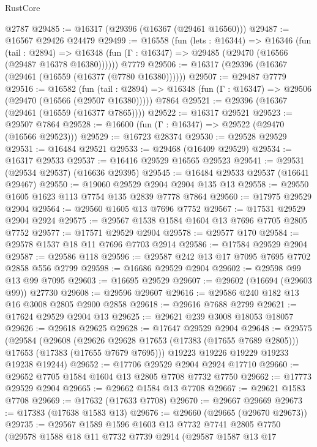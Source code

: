 \begin{lexlean}{RustCore}
\begin{coremodule}
    @2787
@29485 := @16317 (@29396 (@16367 (@29461 @16560)))
@29487 := @16567 @29426 @24479
@29499 := @16558
    (fun (lets : @16344) =>
    @16346
      (fun (tail : @2894) =>
      @16348 (fun (Γ : @16347) => @29485 (@29470 (@16566 (@29487 @16378 @16380))))))
    @7779
@29506 := @16317 (@29396 (@16367 (@29461 (@16559 (@16377 (@7780 @16380))))))
@29507 := @29487 @7779
@29516 := @16582
    (fun (tail : @2894) => @16348 (fun (Γ : @16347) => @29506 (@29470 (@16566 (@29507 @16380)))))
    @7864
@29521 := @29396 (@16367 (@29461 (@16559 (@16377 @7865))))
@29522 := @16317 @29521
@29523 := @29507 @7864
@29528 := @16600 (fun (Γ : @16347) => @29522 (@29470 (@16566 @29523)))
@29529 := @16723 @28374
@29530 := @29528 @29529
@29531 := @16484 @29521
@29533 := @29468 (@16409 @29529)
@29534 := @16317 @29533
@29537 := @16416 @29529 @16565 @29523
@29541 := @29531 (@29534 @29537) (@16636 @29395)
@29545 := @16484 @29533 @29537 (@16641 @29467)
@29550 := @19060 @29529 @2904 @2904 @135 @13
@29558 := @29550 @1605 @1623 @113 @7754 @135 @2839 @7778 @7864
@29560 := @17975 @29529 @2904
@29564 := @29560 @1605 @13 @7696 @7752
@29567 := @17531 @29529 @2904 @2924
@29575 := @29567 @1538 @1584 @1604 @13 @7696 @7705 @2805 @7752
@29577 := @17571 @29529 @2904
@29578 := @29577 @170
@29584 := @29578 @1537 @18 @11 @7696 @7703 @2914
@29586 := @17584 @29529 @2904
@29587 := @29586 @118
@29596 := @29587 @242 @13 @17 @7095 @7695 @7702 @2858 @556 @2799
@29598 := @16686 @29529 @2904
@29602 := @29598 @99 @13 @99 @7095
@29603 := @16695 @29529
@29607 := @29602 (@16694 (@29603 @99)) @27730
@29608 := @29596 @29607
@29616 := @29586 @240 @182 @13 @16 @3008 @2805 @2900 @2858
@29618 := @29616 @7688 @2799
@29621 := @17624 @29529 @2904 @13
@29625 := @29621 @239 @3008 @18053 @18057
@29626 := @29618 @29625
@29628 := @17647 @29529 @2904
@29648 := @29575
    (@29584
      (@29608
        (@29626 @29628 @17653 (@17383 (@17655 @7689 @2805)))
        @17653
        (@17383 (@17655 @7679 @7695)))
      @19223
      @19226
      @19229
      @19233
      @19238
      @19244)
@29652 := @17706 @29529 @2904 @2924 @17710
@29660 := @29652 @7705 @1584 @1604 @13 @2805 @7708 @7732 @7750
@29662 := @17773 @29529 @2904
@29665 := @29662 @1584 @13 @7708
@29667 := @29621 @1583 @7708
@29669 := @17632 (@17633 @7708)
@29670 := @29667 @29669
@29673 := @17383 (@17638 @1583 @13)
@29676 := @29660 (@29665 (@29670 @29673))
@29735 := @29567
    @1589
    @1596
    @1603
    @13
    @7732
    @7741
    @2805
    @7750
    (@29578
      @1588
      @18
      @11
      @7732
      @7739
      @2914
      (@29587
        @1587
        @13
        @17

\end{coremodule}
\end{lexlean}
